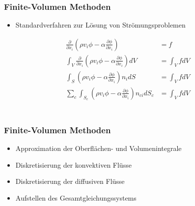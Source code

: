 \documentclass[accentcolor=tud2c,colorbacktitle,inverttitle,landscape,ngerman,presentation,t]{tudbeamer}
\begin{document}
\begin{frame}
  \frametitle{\\Finite-Volumen Methoden}
    \begin{itemize}
      \item Standardverfahren zur Lösung von Strömungsproblemen
  \end{itemize}
\begin{align*}
    \frac{\partial}{\partial x_i} \left({\rho v_i \phi
    - \alpha \frac{\partial \phi}{\partial x_i} }\right) &= f\\
  \int_V \frac{\partial}{\partial x_i} \left({\rho v_i \phi
- \alpha \frac{\partial \phi}{\partial x_i} }\right) dV &= \int_V f dV \\
  \int_S  \left({\rho v_i \phi
- \alpha \frac{\partial \phi}{\partial x_i} }\right) n_i dS&= \int_V f dV \\
      \sum_c \int_{S_c} \left(\rho v_i \phi - \alpha \frac{\partial \phi}{\partial x_i}
      \right) n_{ci} dS_c &= \int_V f dV
\end{align*}
\end{frame}

\begin{frame}
  \frametitle{\\Finite-Volumen Methoden}
  \begin{figure}[ht]
  
\centering
\end{figure}
    \begin{itemize}
      \item Approximation der Oberflächen- und Volumenintegrale
      \item Diskretisierung der konvektiven Flüsse
      \item Diskretisierung der diffusiven Flüsse
      \item Aufstellen des Gesamtgleichungssystems
    \end{itemize}
\end{frame}
\end{document}
